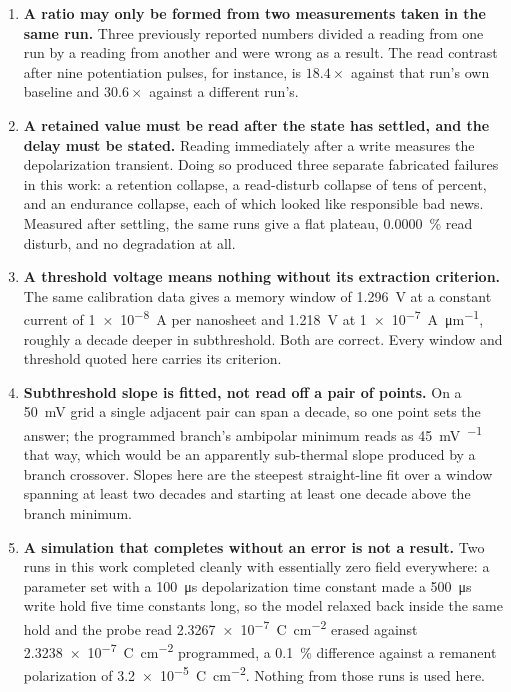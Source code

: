 \begin{enumerate}
\item \textbf{A ratio may only be formed from two measurements taken in the same run.}
  Three previously reported numbers divided a reading from one run by a reading from
  another and were wrong as a result. The read contrast after nine potentiation pulses,
  for instance, is $18.4\times$ against that run's own baseline and $30.6\times$ against
  a different run's.

\item \textbf{A retained value must be read after the state has settled, and the delay
  must be stated.} Reading immediately after a write measures the depolarization
  transient. Doing so produced three separate fabricated failures in this work: a
  retention collapse, a read-disturb collapse of tens of percent, and an endurance
  collapse, each of which looked like responsible bad news. Measured after settling,
  the same runs give a flat plateau, \SI{0.0000}{\percent} read disturb, and no
  degradation at all.

\item \textbf{A threshold voltage means nothing without its extraction criterion.} The
  same calibration data gives a memory window of \SI{1.296}{\volt} at a constant current
  of \SI{1e-8}{\ampere} per nanosheet and \SI{1.218}{\volt} at
  \SI{1e-7}{\ampere\per\micro\metre}, roughly a decade deeper in subthreshold. Both are
  correct. Every window and threshold quoted here carries its criterion.

\item \textbf{Subthreshold slope is fitted, not read off a pair of points.} On a
  \SI{50}{\milli\volt} grid a single adjacent pair can span a decade, so one point sets
  the answer; the programmed branch's ambipolar minimum reads as
  \SI{45}{\milli\volt\per{}} that way, which would be an apparently
  sub-thermal slope produced by a branch crossover. Slopes here are the steepest
  straight-line fit over a window spanning at least two decades and starting at least
  one decade above the branch minimum.

\item \textbf{A simulation that completes without an error is not a result.} Two runs in
  this work completed cleanly with essentially zero field everywhere: a parameter set
  with a \SI{100}{\micro\second} depolarization time constant made a
  \SI{500}{\micro\second} write hold five time constants long, so the model relaxed back
  inside the same hold and the probe read \SI{2.3267e-7}{\coulomb\per\square\centi\metre}
  erased against \SI{2.3238e-7}{\coulomb\per\square\centi\metre} programmed, a
  \SI{0.1}{\percent} difference against a remanent polarization of
  \SI{3.2e-5}{\coulomb\per\square\centi\metre}. Nothing from those runs is used here.


\end{enumerate}
